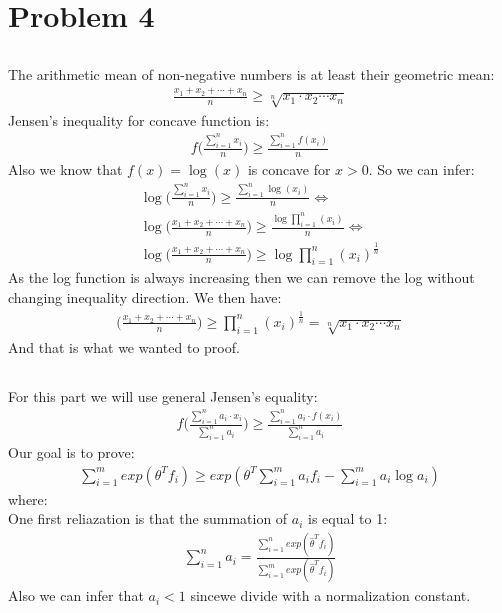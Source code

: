 \section{Problem 4}
\subsection{}
The arithmetic mean of non-negative numbers is at least their geometric mean:
\begin{align*}
\frac{x_1 + x_2 + \cdots + x_n}{n} \geq \sqrt[n]{x_1 \cdot  x_2  \cdots x_n}
\end{align*}
Jensen's inequality for concave function is:
\begin{align*}
f\bigg(\frac{\displaystyle\sum_{i=1}^{n}x_i}{n}\bigg) \geq \frac{\displaystyle\sum_{i=1}^{n}f(x_i)}{n}
\end{align*}
Also we know that $f(x) = \log(x)$ is concave for $x > 0$. So we can infer:
\begin{align*}
\log\bigg(\frac{\displaystyle\sum_{i=1}^{n}x_i}{n}\bigg) \geq \frac{\displaystyle\sum_{i=1}^{n}\log(x_i)}{n} \Leftrightarrow \\
\log\bigg(\frac{x_1 + x_2 + \cdots + x_n}{n}\bigg) \geq \frac{\log\displaystyle\prod_{i=1}^{n}(x_i)}{n} \Leftrightarrow \\
\log\bigg(\frac{x_1 + x_2 + \cdots + x_n}{n}\bigg) \geq \log\displaystyle\prod_{i=1}^{n}(x_i)^\frac{1}{n}
\end{align*}
As the log function is always increasing then we can remove the log without changing inequality direction.
We then have:
\begin{align*}
\bigg(\frac{x_1 + x_2 + \cdots + x_n}{n}\bigg) \geq \displaystyle\prod_{i=1}^{n}(x_i)^\frac{1}{n} = \sqrt[n]{x_1 \cdot  x_2  \cdots x_n}
\end{align*}
And that is what we wanted to proof.
\subsection{}
For this part we will use general Jensen's equality:
\begin{align*}
f\bigg(\frac{\displaystyle\sum_{i=1}^{n}a_i \cdot x_i}{\displaystyle\sum_{i=1}^{n}a_i}\bigg) \geq \frac{\displaystyle\sum_{i=1}^{n}a_i\cdot f(x_i)}{\displaystyle\sum_{i=1}^{n}a_i}
\end{align*}
Our goal is to prove:
\begin{align}\label{eq:one}
\displaystyle\sum_{i=1}^{m}exp(\theta^T f_i) \geq exp(\theta^T \displaystyle\sum_{i=1}^{m}a_i f_i - \displaystyle\sum_{i=1}^{m}a_i\log a_i)
\end{align}
where:\\
One first reliazation is that the summation of $a_i$ is equal to 1:
\begin{align*}
\displaystyle\sum_{i=1}^{n}a_i = \frac{\displaystyle\sum_{i=1}^{n}exp(\hat{\theta}^T f_i)}{\displaystyle\sum_{i=1}^{m}exp(\hat{\theta}^T f_i)}
\end{align*}
Also we can infer that $a_i < 1$ sincewe divide with a normalization constant.\\

